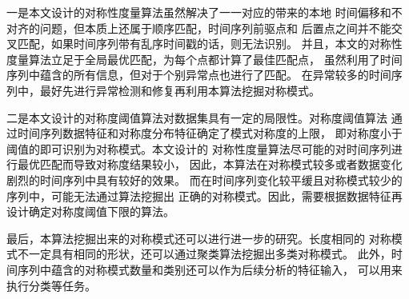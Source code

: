 一是本文设计的对称性度量算法虽然解决了一一对应的带来的本地
时间偏移和不对齐的问题，但本质上还属于顺序匹配，时间序列前驱点和
后置点之间并不能交叉匹配，如果时间序列带有乱序时间戳的话，则无法识别。
并且，本文的对称性度量算法立足于全局最优匹配，为每个点都计算了最佳匹配点，
虽然利用了时间序列中蕴含的所有信息，但对于个别异常点也进行了匹配。
在异常较多的时间序列中，最好先进行异常检测和修复再利用本算法挖掘对称模式。

二是本文设计的对称度阈值算法对数据集具有一定的局限性。对称度阈值算法
通过时间序列数据特征和对称度分布特征确定了模式对称度的上限，
即对称度小于阈值的即可识别为对称模式。本文设计的
对称性度量算法尽可能的对时间序列进行最优匹配而导致对称度结果较小，
因此，本算法在对称模式较多或者数据变化剧烈的时间序列中具有较好的效果。
而在时间序列变化较平缓且对称模式较少的序列中，可能无法通过算法挖掘出
正确的对称模式。因此，需要根据数据特征再设计确定对称度阈值下限的算法。

最后，本算法挖掘出来的对称模式还可以进行进一步的研究。长度相同的
对称模式不一定具有相同的形状，还可以通过聚类算法挖掘出多类对称模式。
此外，时间序列中蕴含的对称模式数量和类别还可以作为后续分析的特征输入，
可以用来执行分类等任务。




